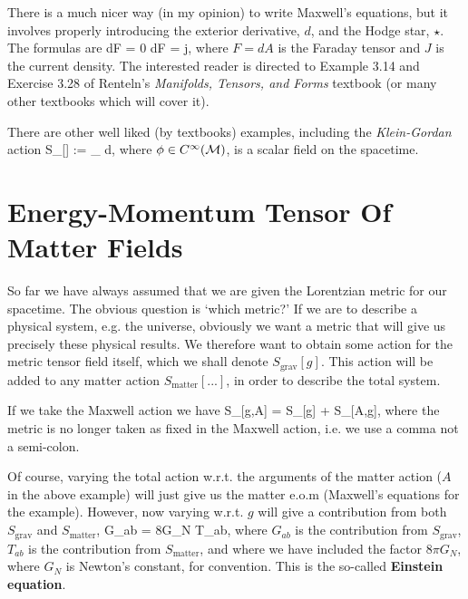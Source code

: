 \br 
    There is a much nicer way (in my opinion) to write Maxwell's equations, but it involves properly introducing the exterior derivative, $d$, and the Hodge star, $\star$. The formulas are 
    \bse 
        dF = 0 \qand d\star F = \star j,
    \ese
    where $F=dA$ is the Faraday tensor and $J$ is the current density. The interested reader is directed to Example 3.14 and Exercise 3.28 of Renteln's \textit{Manifolds, Tensors, and Forms} textbook (or many other textbooks which will cover it).
\er 

There are other well liked (by textbooks) examples, including the \textit{Klein-Gordan} action 
\bse 
    S_{}[\phi] := \int_{\cM} d\phi {},
\ese 
where $\phi\in C^{\infty}(\mathcal{M})$, is a scalar field on the spacetime.

\section{Energy-Momentum Tensor Of Matter Fields}

So far we have always assumed that we are given the Lorentzian metric for our spacetime. The obvious question is `which metric?' If we are to describe a physical system, e.g. the universe, obviously we want a metric that will give us precisely these physical results. We therefore want to obtain some action for the metric tensor field itself, which we shall denote $S_{\text{grav}}[g]$. This action will be added to any matter action $S_{\text{matter}}[...]$, in order to describe the total system. 

\bex 
    If we take the Maxwell action we have 
    \bse 
        S_{}[g,A] = S_{}[g] + S_{}[A,g],
    \ese 
    where the metric is no longer taken as fixed in the Maxwell action, i.e. we use a comma not a semi-colon. 
\eex 

Of course, varying the total action w.r.t. the arguments of the matter action ($A$ in the above example) will just give us the matter e.o.m  (Maxwell's equations for the example). However, now varying w.r.t. $g$ will give a contribution from both $S_{\text{grav}}$ and $S_{\text{matter}}$, 
\bse 
    G_{ab} = 8\pi G_N T_{ab},
\ese
where $G_{ab}$ is the contribution from $S_{\text{grav}}$, $T_{ab}$ is the contribution from $S_{\text{matter}}$, and where we have included the factor $8\pi G_N$, where $G_N$ is Newton's constant, for convention. This is the so-called \textbf{Einstein equation}.

